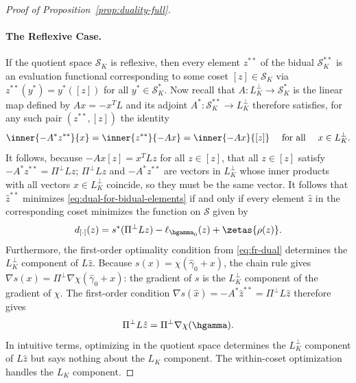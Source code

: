 \documentclass{article}
\newcommand{\calS}{\mathcal{S}}
\begin{document}
\begin{proof}[Proof of
Proposition~\ref{prop:duality-full}]
\paragraph{The Reflexive Case.} If the quotient space $\calS_K$ is reflexive, then every element $z^{**}$ of the bidual $\calS_K^{**}$ is an evaluation functional
corresponding to some coset $[z] \in \calS_K$ via $z^{**}(y^*) = y^*([z])$ for all $y^* \in \calS_K^*$. Now recall that $A: L_K^\perp \to \calS_K^{*}$
is the linear map defined by $Ax = -x^T L$  and its adjoint $A^{*}: \calS_K^{**} \to L_K^\perp$ therefore satisfies, for any such pair $(z^{**}, [z])$ the identity
\[
\inner{-A^{*} z^{**}}{x} = \inner{z^{**}}{-Ax} = \inner{-Ax}{[z]} \qqtext{ for all } x \in L_K^\perp.
\]
It follows, because $-Ax [z] = x^T L z$ for all $z \in [z]$, that all $z \in [z]$ satisfy $-A^{*} z^{**}=\Pi^\perp L z$; $\Pi^\perp L z$
and $-A^{*} z^{**}$ are vectors in $L_K^\perp$ whose inner products with all vectors $x \in L_K^\perp$ coincide, so they must be the same
vector.  It follows that $\hat z^{**}$ minimizes \eqref{eq:dual-for-bidual-elements} if and only if every element $\hat z$ in the corresponding coset minimizes the function on $\calS$ given by
\begin{equation}
\label{eq:dual-for-primal-elements}
    d_{[\cdot]}(z) = s^{*}(\Pi^\perp L z) - \ell_{\hgamma_0}(z) + \zetas\{\rho(z)\}.
\end{equation}
Furthermore, the first-order optimality condition from \eqref{eq:fr-dual} determines the $L_K^\perp$ component of $L\hat z$. Because $s(x) = \chi(\hat\gamma_0 + x)$, the chain rule gives $\nabla s(x) = \Pi^\perp \nabla\chi(\hat\gamma_0 + x)$: the gradient of $s$ is the $L_K^\perp$ component of the gradient of $\chi$. The first-order condition $\nabla s(\hat x) = -A^*\hat z^{**} = \Pi^\perp L\hat z$ therefore gives
\[
\Pi^\perp L\hat z = \Pi^\perp \nabla\chi(\hgamma).
\]
In intuitive terms, optimizing in the quotient space determines the $L_K^\perp$ component of $L\hat z$ but says nothing about the $L_K$ component. The within-coset optimization handles the $L_K$ component.


\end{proof}
\end{document}
